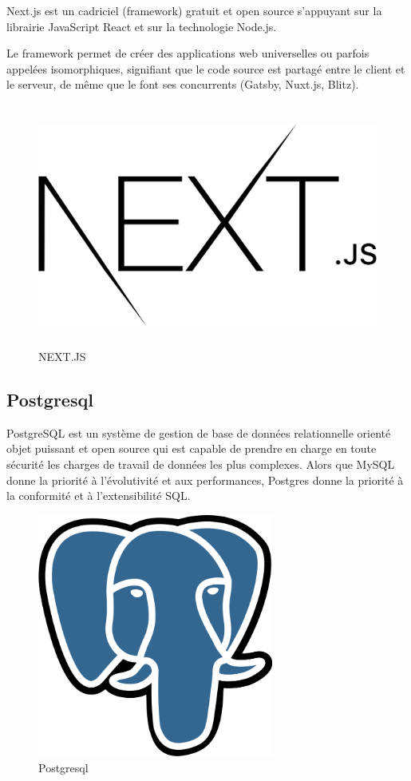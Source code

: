 Next.js est un cadriciel (framework) gratuit et open source s'appuyant sur la librairie JavaScript React et sur la technologie Node.js.

Le framework permet de créer des applications web universelles ou parfois appelées isomorphiques, signifiant que le code source est partagé entre le client et le serveur, de même que le font ses concurrents (Gatsby, Nuxt.js, Blitz).

\begin{figure}[!h]
\begin{center}
\includegraphics[height=8cm]{Nextjs.svg.png}
\end{center}
\caption{NEXT.JS}
\end{figure}

\subsection{Postgresql}

PostgreSQL est un système de gestion de base de données relationnelle orienté objet puissant et open source qui est capable de prendre en charge en toute sécurité les charges de travail de données les plus complexes. Alors que MySQL donne la priorité à l'évolutivité et aux performances, Postgres donne la priorité à la conformité et à l'extensibilité SQL.

\begin{figure}[!h]
\begin{center}
\includegraphics[height=8cm]{Postgresql.svg.png}
\end{center}
\caption{Postgresql}
\end{figure}



